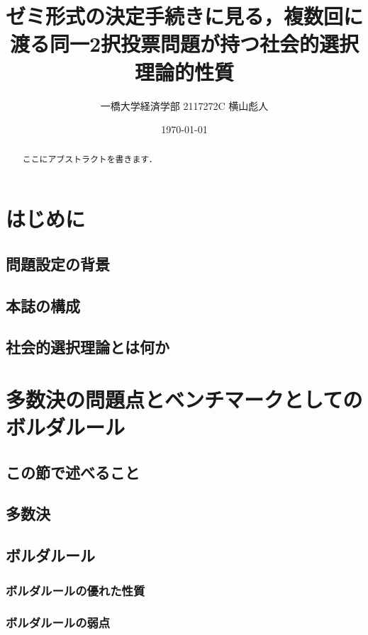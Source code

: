 \documentclass{jsarticle}
\begin{document}
\title{ゼミ形式の決定手続きに見る，複数回に渡る同一2択投票問題が持つ社会的選択理論的性質}
\author{一橋大学経済学部 2117272C 横山彪人}
\date{\today}
\maketitle

\begin{abstract}
  ここにアブストラクトを書きます．
\end{abstract}

\tableofcontents
\clearpage

\section{はじめに}
\subsection{問題設定の背景}

\subsection{本誌の構成}

\subsection{社会的選択理論とは何か}

\section{多数決の問題点とベンチマークとしてのボルダルール}
\subsection{この節で述べること}

\subsection{多数決}

\subsection{ボルダルール}
\subsubsection{ボルダルールの優れた性質}
\subsubsection{ボルダルールの弱点}
\end{document}
